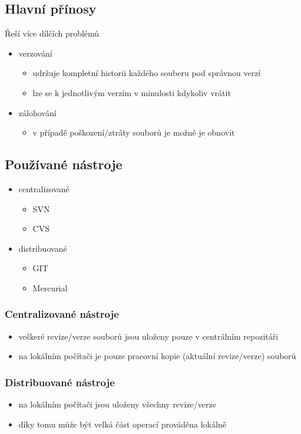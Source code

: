 \documentclass{szzclass}
\begin{document}
\subsection{Hlavní přínosy}
Řeší více dílčích problémů
\begin{itemize}
    \item verzování
    \begin{itemize}
        \item udržuje kompletní historii každého souberu pod správnou verzí
        \item lze se k jednotlivým verzím v minulosti kdykoliv vrátit
    \end{itemize}
    \item zálohování
    \begin{itemize}
        \item v případě poškození/ztráty souborů je možné je obnovit
    \end{itemize}
\end{itemize}
\subsection{Používané nástroje}
\begin{itemize}
    \item centralizované
    \begin{itemize}
        \item SVN
        \item CVS
    \end{itemize}
    \item distribuované
    \begin{itemize}
        \item GIT
        \item Mercurial
    \end{itemize}
\end{itemize}
\subsubsection{Centralizované nástroje}
\begin{itemize}
    \item veškeré revize/verze souborů jsou uloženy pouze v centrálním repozitáři
    \item na lokálním počítači je pouze pracovní kopie (aktuální revize/verze) souborů
\end{itemize}
\subsubsection{Distribuované nástroje}
\begin{itemize}
    \item na lokálním počítači jsou uloženy všechny revize/verze
    \item díky tomu může být velká část operací prováděna lokálně
\end{itemize}
\end{document}
